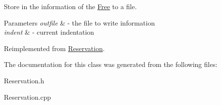 Store in the information of the \mbox{\hyperlink{class_free}{Free}} to a file. 


\begin{DoxyParams}{Parameters}
{\em outfile} & -\/ the file to write information \\
\hline
{\em indent} & -\/ current indentation \\
\hline
\end{DoxyParams}


Reimplemented from \mbox{\hyperlink{class_reservation_a8ec83fe2eb15294c3a51a9998ed17df7}{Reservation}}.



The documentation for this class was generated from the following files\+:\begin{DoxyCompactItemize}
\item 
Reservation.\+h\item 
Reservation.\+cpp\end{DoxyCompactItemize}
